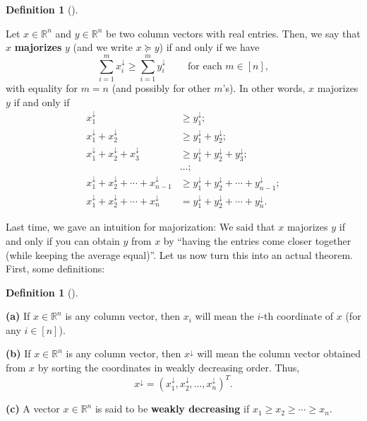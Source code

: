 \documentclass[numbers=enddot,12pt,final,onecolumn,notitlepage]{scrartcl}%
\numberwithin{exer}{subsection}
\theoremstyle{definition}
\newtheorem{defi}[theo]{Definition}
\newenvironment{definition}[1][]
{\begin{defi}[#1]\begin{leftbar}}
{\end{leftbar}\end{defi}}
\let\sumnonlimits\sum
\renewcommand{\sum}{\sumnonlimits\limits}
\begin{document}
\begin{definition}
Let $x\in\mathbb{R}^{n}$ and $y\in\mathbb{R}^{n}$ be two column vectors with
real entries. Then, we say that $x$ \textbf{majorizes} $y$ (and we write
$x\succcurlyeq y$) if and only if we have%
\[
\sum_{i=1}^{m}x_{i}^{\downarrow}\geq\sum_{i=1}^{m}y_{i}^{\downarrow
}\ \ \ \ \ \ \ \ \ \ \text{for each }m\in\left[  n\right]  ,
\]
with equality for $m=n$ (and possibly for other $m$'s). In other words, $x$
majorizes $y$ if and only if%
\begin{align*}
x_{1}^{\downarrow}  &  \geq y_{1}^{\downarrow};\\
x_{1}^{\downarrow}+x_{2}^{\downarrow}  &  \geq y_{1}^{\downarrow}%
+y_{2}^{\downarrow};\\
x_{1}^{\downarrow}+x_{2}^{\downarrow}+x_{3}^{\downarrow}  &  \geq
y_{1}^{\downarrow}+y_{2}^{\downarrow}+y_{3}^{\downarrow};\\
&  \ldots;\\
x_{1}^{\downarrow}+x_{2}^{\downarrow}+\cdots+x_{n-1}^{\downarrow}  &  \geq
y_{1}^{\downarrow}+y_{2}^{\downarrow}+\cdots+y_{n-1}^{\downarrow};\\
x_{1}^{\downarrow}+x_{2}^{\downarrow}+\cdots+x_{n}^{\downarrow}  &
=y_{1}^{\downarrow}+y_{2}^{\downarrow}+\cdots+y_{n}^{\downarrow}.
\end{align*}

\end{definition}

Last time, we gave an intuition for majorization: We said that $x$ majorizes
$y$ if and only if you can obtain $y$ from $x$ by \textquotedblleft having the
entries come closer together (while keeping the average
equal)\textquotedblright. Let us now turn this into an actual theorem. First,
some definitions:

\begin{definition}
\textbf{(a)} If $x\in\mathbb{R}^{n}$ is any column vector, then $x_{i}$ will
mean the $i$-th coordinate of $x$ (for any $i\in\left[  n\right]  $).

\textbf{(b)} If $x\in\mathbb{R}^{n}$ is any column vector, then $x^{\downarrow
}$ will mean the column vector obtained from $x$ by sorting the coordinates in
weakly decreasing order. Thus,%
\[
x^{\downarrow}=\left(  x_{1}^{\downarrow},x_{2}^{\downarrow},\ldots
,x_{n}^{\downarrow}\right)  ^{T}.
\]


\textbf{(c)} A vector $x\in\mathbb{R}^{n}$ is said to be \textbf{weakly
decreasing} if $x_{1}\geq x_{2}\geq\cdots\geq x_{n}$.
\end{definition}
\end{document}
